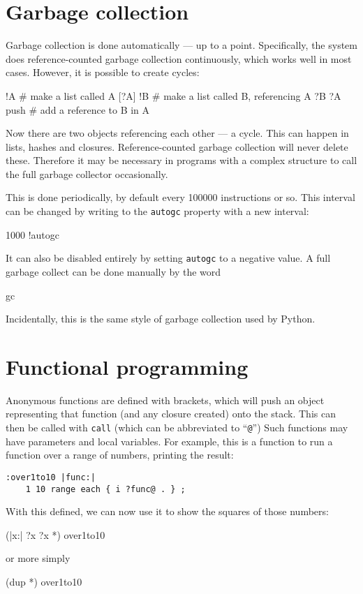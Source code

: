 \section{Garbage collection}
Garbage collection is done automatically --- up to a point. Specifically,
the system does reference-counted garbage collection continuously,
which works well in most cases. However, it is possible to
create cycles:
\begin{v}
    [] !A              # make a list called A
    [?A] !B            # make a list called B, referencing A
    ?B ?A push         # add a reference to B in A
\end{v}
Now there are two objects referencing each other --- a cycle. This can
happen in lists, hashes and closures. Reference-counted garbage
collection will never delete these. Therefore it may be necessary
in programs with a complex structure to call the full garbage collector
occasionally.

This is done periodically, by default every 100000 instructions or so.
This interval can be changed by writing to the \verb+autogc+ property
with a new interval:
\begin{v}
1000 !autogc
\end{v}
It can also be disabled entirely by setting \texttt{autogc} to a negative
value.
A full garbage collect can be done manually by the word
\begin{v}
    gc
\end{v}
Incidentally, this is
the same style of garbage collection used by Python.



\section{Functional programming}
\indw{(}\indw{)}
Anonymous functions are defined with brackets, which will push an object
representing that function (and any closure created) onto the stack. This can
then be called with \texttt{call}  (which can be abbreviated to ``\texttt{@}'')
Such functions may have parameters and local variables.
For example, this is a function to run a function over a range of numbers,
printing the result:
\begin{lstlisting}
:over1to10 |func:|
    1 10 range each { i ?func@ . } ;
\end{lstlisting}
With this defined, we can now use it to show the squares of those
numbers:        
\begin{v}
    (|x:| ?x ?x *) over1to10
\end{v}
or more simply
\begin{v}
    (dup *) over1to10
\end{v}

